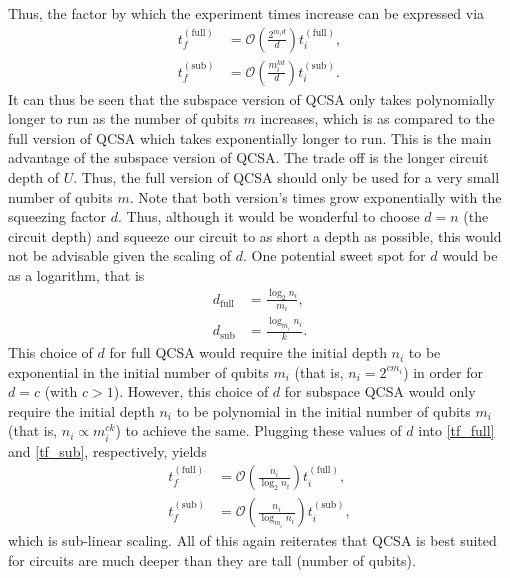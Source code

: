 \documentclass[10pt]{article}
\begin{document}
Thus, the factor by which the experiment times increase can be expressed via
\begin{align}
\label{tf_full}
t^{(\text{full})}_f 
&= 
\mathcal{O}\left(\frac{2^{m_id}}{d}\right)
t^{(\text{full})}_i,
\\
\label{tf_sub}
t^{(\text{sub})}_f 
&= 
\mathcal{O}\left(\frac{m_i^{kd}}{d}\right)
t^{(\text{sub})}_i.
\end{align}
It can thus be seen that the subspace version of QCSA only takes polynomially longer to run as the number of qubits $m$ increases, which is as compared to the full version of QCSA which takes exponentially longer to run. This is the main advantage of the subspace version of QCSA. The trade off is the longer circuit depth of $U$. Thus, the full version of QCSA should only be used for a very small number of qubits $m$. Note that both version's times grow exponentially with the squeezing factor $d$. Thus, although it would be wonderful to choose $d=n$ (the circuit depth) and squeeze our circuit to as short a depth as possible, this would not be advisable given the scaling of $d$. One potential sweet spot for $d$ would be as a logarithm, that is 
\begin{align}
d_{\text{full}}&=\frac{\log_{2}{n_i}}{m_i},
\\
d_{\text{sub}}&=\frac{\log_{m_i}{n_i}}{k}.
\end{align}
This choice of $d$ for full QCSA would require the initial depth $n_i$ to be exponential in the initial number of qubits $m_i$ (that is, $n_i=2^{cm_i}$) in order for $d=c$ (with $c>1$). However, this choice of $d$ for subspace QCSA would only require the initial depth $n_i$ to be polynomial in the initial number of qubits $m_i$ (that is, $n_i\propto m_i^{ck}$) to achieve the same.
Plugging these values of $d$ into \ref{tf_full} and \ref{tf_sub}, respectively, yields
\begin{align}
\label{tf_full}
t^{(\text{full})}_f 
&= 
\mathcal{O}\left(\frac{n_i}{\log_{2}{n_i}}\right)
t^{(\text{full})}_i,
\\
\label{tf_sub}
t^{(\text{sub})}_f 
&= 
\mathcal{O}\left(\frac{n_i}{\log_{m_i}{n_i}}\right)
t^{(\text{sub})}_i,
\end{align}
which is sub-linear scaling. All of this again reiterates that QCSA is best suited for circuits are much deeper than they are tall (number of qubits). 
\end{document}
